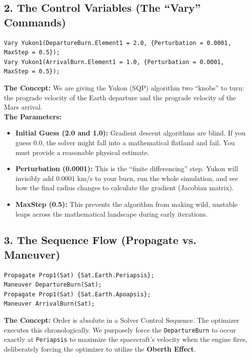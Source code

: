 \documentclass[11pt, letterpaper]{article}
\begin{document}
\subsection*{2. The Control Variables (The ``Vary'' Commands)}
\begin{lstlisting}[numbers=none]
Vary Yukon1(DepartureBurn.Element1 = 2.0, {Perturbation = 0.0001, MaxStep = 0.5});
Vary Yukon1(ArrivalBurn.Element1 = 1.0, {Perturbation = 0.0001, MaxStep = 0.5});
\end{lstlisting}
\textbf{The Concept:} We are giving the Yukon (SQP) algorithm two ``knobs'' to turn: the prograde velocity of the Earth departure and the prograde velocity of the Mars arrival. 
\\
\textbf{The Parameters:}
\begin{itemize}[noitemsep]
    \item \textbf{Initial Guess (2.0 and 1.0):} Gradient descent algorithms are blind. If you guess 0.0, the solver might fall into a mathematical flatland and fail. You must provide a reasonable physical estimate.
    \item \textbf{Perturbation (0.0001):} This is the ``finite differencing'' step. Yukon will invisibly add $0.0001$ km/s to your burn, run the whole simulation, and see how the final radius changes to calculate the gradient (Jacobian matrix).
    \item \textbf{MaxStep (0.5):} This prevents the algorithm from making wild, unstable leaps across the mathematical landscape during early iterations.
\end{itemize}

\subsection*{3. The Sequence Flow (Propagate vs. Maneuver)}
\begin{lstlisting}[numbers=none]
Propagate Prop1(Sat) {Sat.Earth.Periapsis};
Maneuver DepartureBurn(Sat);
Propagate Prop1(Sat) {Sat.Earth.Apoapsis};
Maneuver ArrivalBurn(Sat);
\end{lstlisting}
\textbf{The Concept:} Order is absolute in a Solver Control Sequence. The optimizer executes this chronologically. We purposely force the \texttt{DepartureBurn} to occur exactly at \texttt{Periapsis} to maximize the spacecraft's velocity when the engine fires, deliberately forcing the optimizer to utilize the \textbf{Oberth Effect}. 

\end{document}
